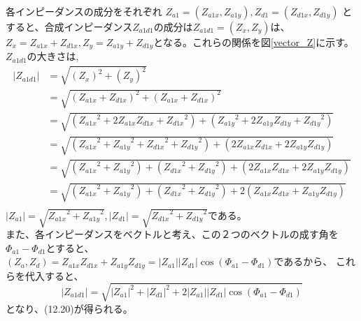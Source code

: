 \documentclass[fleqn,11pt,a4paper,dvipdfmx]{jsarticle}
\numberwithin{equation}{section}
\begin{document}
各インピーダンスの成分をそれぞれ
$Z_{a1} = \left(Z_{a1x} , Z_{a1y}\right) , Z_{d1} = \left(Z_{d1x} , Z_{d1y}\right) $
とすると、合成インピーダンス$Z_{a1d1}$の成分は$Z_{a1d1} = \left(Z_x , Z_y\right)$は、
$Z_x = Z_{a1x} + Z_{d1x} , Z_y = Z_{a1y} + Z_{d1y}$となる。これらの関係を図\ref{vector_Z}に示す。\\
$Z_{a1d1}$の大きさは,\\
\begin{align*}
  \left|Z_{a1d1}\right| & = \sqrt{ {\left(Z_x\right)}^2 + {\left(Z_y\right)}^2 }                                                                                            \\
                        & = \sqrt{ {\left(Z_{a1x} + Z_{d1x}\right)}^2 + {\left(Z_{a1x} + Z_{d1x}\right)}^2 }                                                                \\
                        & = \sqrt{ \left( {Z_{a1x}}^2 + 2Z_{a1x}Z_{d1x} + {Z_{d1x}}^2 \right) + \left( {Z_{a1y}}^2 + 2Z_{a1y}Z_{d1y} + {Z_{d1y}}^2 \right)}                 \\
                        & =  \sqrt{ \left( {Z_{a1x}}^2 + {Z_{a1y}}^2 + {Z_{d1x}}^2  + {Z_{d1y}}^2 \right) + \left(2Z_{a1x}Z_{d1x} + 2Z_{a1y}Z_{d1y}  \right)}               \\
                        & =  \sqrt{ \left( {Z_{a1x}}^2 + {Z_{a1y}}^2 \right) + \left({Z_{d1x}}^2  + {Z_{d1y}}^2 \right) + \left(2Z_{a1x}Z_{d1x} + 2Z_{a1y}Z_{d1y}  \right)} \\
                        & =  \sqrt{ \left( {Z_{a1x}}^2 + {Z_{a1y}}^2 \right) + \left({Z_{d1x}}^2  + {Z_{d1y}}^2 \right) + 2\left(Z_{a1x}Z_{d1x} + Z_{a1y}Z_{d1y}  \right)}  \\
\end{align*}
$\left|Z_{a1}\right| = \sqrt{{{Z_{a1x}}^2 + {Z_{a1y}}^2}},\left|Z_{d1}\right| = \sqrt{{{Z_{d1x}}^2 + {Z_{d1y}}^2}}$である。\\
また、各インピーダンスをベクトルと考え、この２つのベクトルの成す角を$\Phi_{a1} - \Phi_{d1}$とすると、\\
$\left(Z_a , Z_d\right) = Z_{a1x}Z_{d1x} + Z_{a1y}Z_{d1y} = \left|Z_{a1}\right| \left|Z_{d1}\right| \cos \left(\Phi_{a1} - \Phi_{d1}\right)$であるから、
これらを代入すると、
\begin{equation*}
  \left|Z_{a1d1}\right| = \sqrt{ {\left|Z_{a1}\right|}^2 + {\left|Z_{d1}\right|}^2 + 2 \left|Z_{a1}\right| \left|Z_{d1}\right| \cos \left(\Phi_{a1} - \Phi_{d1}\right)}
\end{equation*}
となり、(12.20)が得られる。
\end{document}
